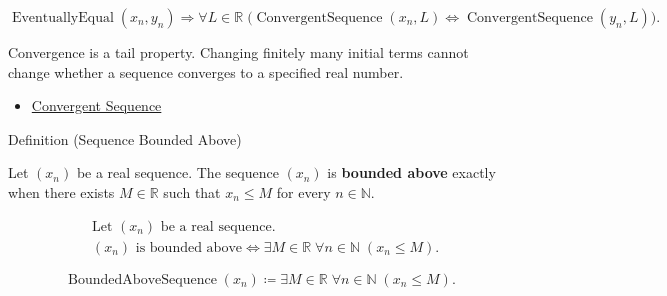 \begin{remark*}
\[
\operatorname{EventuallyEqual}(x_n,y_n)
\Longrightarrow
\forall L \in \mathbb{R}\;
\bigl(
\operatorname{ConvergentSequence}(x_n,L)
\Longleftrightarrow
\operatorname{ConvergentSequence}(y_n,L)
\bigr).
\]
\end{remark*}

\begin{remark*}[Interpretation]
Convergence is a tail property. Changing finitely many initial terms cannot
change whether a sequence converges to a specified real number.
\end{remark*}

\begin{dependencies}
\begin{itemize}
  \item \hyperref[def:convergent-sequence]{Convergent Sequence}
\end{itemize}
\end{dependencies}


\begin{definitionbox}{Definition (Sequence Bounded Above)}
\begin{definition}
\label{def:sequence-bounded-above}
Let $(x_n)$ be a real sequence. The sequence $(x_n)$ is
\textbf{bounded above} exactly when there exists $M \in \mathbb{R}$ such
that $x_n \le M$ for every $n \in \mathbb{N}$.
\end{definition}
\end{definitionbox}

\begin{remark*}
\[
\begin{aligned}
&\text{Let } (x_n) \text{ be a real sequence.}\\
&(x_n) \text{ is bounded above}
\Longleftrightarrow
\exists M \in \mathbb{R}\;
\forall n \in \mathbb{N}\;(x_n \le M).
\end{aligned}
\]
\end{remark*}

\begin{remark*}
\[
\operatorname{BoundedAboveSequence}(x_n)
\coloneqq
\exists M \in \mathbb{R}\;
\forall n \in \mathbb{N}\;(x_n \le M).
\]
\end{remark*}

